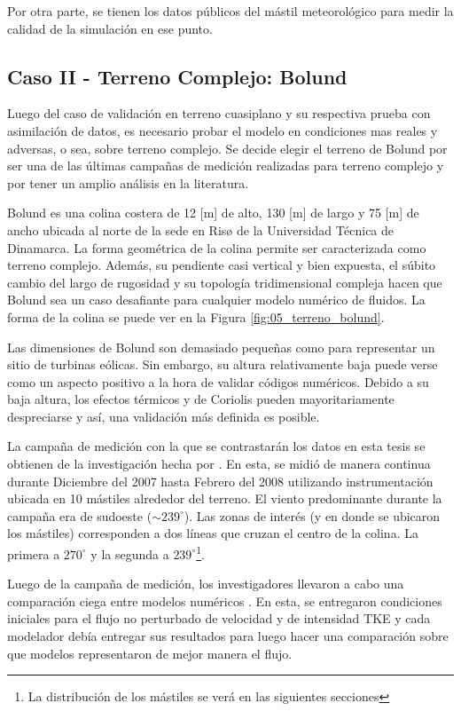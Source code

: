 Por otra parte, se tienen los datos públicos del mástil meteorológico para medir la calidad de la simulación en ese punto.
\subsection{Caso II - Terreno Complejo: Bolund}
Luego del caso de validación en terreno cuasiplano y su respectiva prueba con asimilación de datos, es necesario probar el modelo en condiciones mas reales y adversas, o sea, sobre terreno complejo. Se decide elegir el terreno de Bolund por ser una de las últimas campañas de medición realizadas para terreno complejo y por tener un amplio análisis en la literatura.

Bolund es una colina costera de 12 [m] de alto, 130 [m] de largo y 75 [m] de ancho ubicada al norte de la sede en Risø de la Universidad Técnica de Dinamarca. La forma geométrica de la colina permite ser caracterizada como terreno complejo. Además, su pendiente casi vertical y bien expuesta, el súbito cambio del largo de rugosidad y su topología tridimensional compleja hacen que Bolund sea un caso desafiante para cualquier modelo numérico de fluidos. La forma de la colina se puede ver en la Figura \ref{fig:05_terreno_bolund}.

Las dimensiones de Bolund son demasiado pequeñas como para representar un sitio de turbinas eólicas. Sin embargo, su altura relativamente baja puede verse como un aspecto positivo a la hora de validar códigos numéricos. Debido a su baja altura, los efectos térmicos y de Coriolis pueden mayoritariamente despreciarse y así, una validación más definida es posible.

La campaña de medición con la que se contrastarán los datos en esta tesis se obtienen de la investigación hecha por \cite{3d4285ac04444eb3b9775baf9af052c6}. En esta, se midió de manera continua durante Diciembre del 2007 hasta Febrero del 2008 utilizando instrumentación ubicada en 10 mástiles alrededor del terreno.  El viento predominante durante la campaña era de sudoeste ($\sim\!239^\circ$). Las zonas de interés (y en donde se ubicaron los mástiles) corresponden a dos líneas que cruzan el centro de la colina. La primera a $270^\circ$ y la segunda a $239^\circ$\footnote{La distribución de los mástiles se verá en las siguientes secciones}.

Luego de la campaña de medición, los investigadores llevaron a cabo una comparación ciega entre modelos numéricos \citep{Bechmann2011}. En esta, se entregaron condiciones iniciales para el flujo no perturbado de velocidad y de intensidad TKE y cada modelador debía entregar sus resultados para luego hacer una comparación sobre que modelos representaron de mejor manera el flujo.

